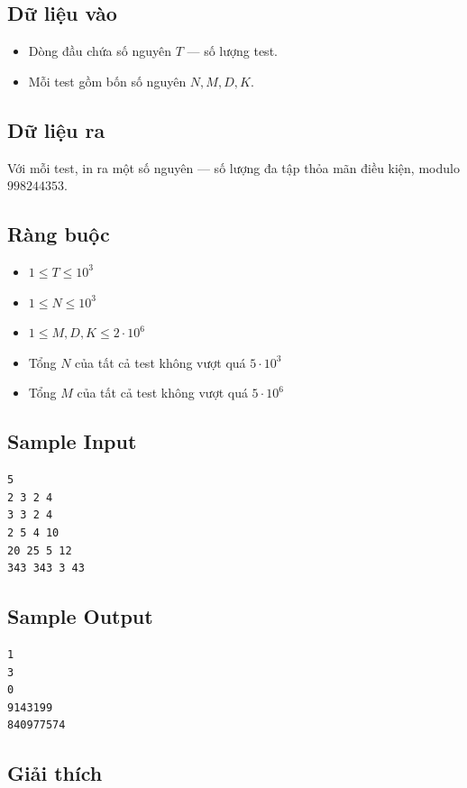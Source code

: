 \subsection*{Dữ liệu vào}

\begin{itemize}
    \item Dòng đầu chứa số nguyên $T$ — số lượng test.
    \item Mỗi test gồm bốn số nguyên $N, M, D, K$.
\end{itemize}

\subsection*{Dữ liệu ra}

Với mỗi test, in ra một số nguyên — số lượng đa tập thỏa mãn điều kiện, modulo $998244353$.

\subsection*{Ràng buộc}

\begin{itemize}
    \item $1 \le T \le 10^3$
    \item $1 \le N \le 10^3$
    \item $1 \le M, D, K \le 2 \cdot 10^6$
    \item Tổng $N$ của tất cả test không vượt quá $5 \cdot 10^3$
    \item Tổng $M$ của tất cả test không vượt quá $5 \cdot 10^6$
\end{itemize}

\subsection*{Sample Input}

\begin{verbatim}
5
2 3 2 4
3 3 2 4
2 5 4 10
20 25 5 12
343 343 3 43
\end{verbatim}

\subsection*{Sample Output}

\begin{verbatim}
1
3
0
9143199
840977574
\end{verbatim}

\subsection*{Giải thích}

